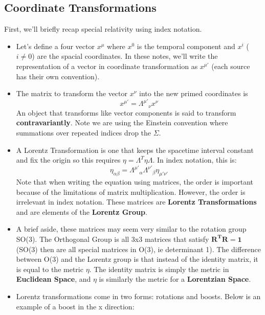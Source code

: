 \documentclass[11pt]{article}
\begin{document}
\subsection{Coordinate Transformations}
First, we'll briefly recap special relativity using index notation. 
    \begin{itemize}
        \item Let's define a four vector \( x^{\mu} \) where \( x^{0} \) is the temporal component and \( x^{i} \) (\( i \neq 0 \)) are the spacial coordinates.
        In these notes, we'll write the representation of a vector in coordinate transformation as \( x^{\mu'} \) (each source has     their own convention). 
        
        \item  The matrix to transform the vector \( x^{\nu} \) into the new primed coordinates is
        \[ 
            x^{\mu'} = \Lambda^{\mu'}{}_\nu x^{\nu}
        \]
        An object that transforms like vector components is said to transform \textbf{contravariantly}. Note we are using the Einstein convention where summations over repeated indices drop
        the \( \Sigma \). 
    
        \item A Lorentz Transformation is one that keeps the spacetime interval constant and fix the origin so this requires \( \eta = \Lambda^{T} \eta \Lambda \). In index notation, this is:
        \[ 
            \eta_{\alpha \beta} = \Lambda^{\mu'}{}_{\alpha} \Lambda^{{\nu'}}{}_{\beta}\eta_{\mu' \nu'}
        \]
        Note that when writing the equation using matrices, the order is important because of the limitations of matrix multiplication. However, the order is irrelevant
        in index notation. These matrices are \textbf{Lorentz Transformations} and are elements of the \textbf{Lorentz Group}.

        \item A brief aside, these matrices may seem very similar to the rotation group SO(3). The Orthogonal Group is all 3x3 matrices that satisfy \( \mathbf{R}^{\mathbf{T}}\mathbf{R} = \mathbf{1} \)
        (SO(3) then are all special matrices in O(3), ie determinant 1). The difference between O(3) and the Lorentz group is that instead of the identity matrix, it is equal
        to the metric \( \eta \). The identity matrix is simply the metric in \textbf{Euclidean Space}, and \( \eta \) is similarly the metric for a \textbf{Lorentzian Space}.
        
        \item Lorentz transformations come in two forms: rotations and boosts. Below is an example of a boost in the x direction:


\end{itemize}
\end{document}
